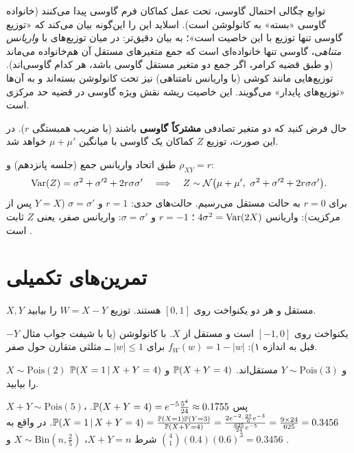 \begin{note}
\notetitle توابع چگالی احتمال گاوسی، تحت عمل  کماکان فرم گاوسی پیدا می‌کنند (خانواده گاوسی «بسته» به کانولوشن است). اسلاید این را این‌گونه بیان می‌کند که «توزیع گاوسی تنها توزیع با این خاصیت است»؛ به بیان دقیق‌تر: در میان توزیع‌های با \emph{واریانس متناهی}، گاوسی تنها خانواده‌ای است که جمع متغیرهای مستقل آن هم‌خانواده می‌ماند (و طبق قضیه کرامر، اگر جمع دو متغیر مستقل گاوسی باشد، هر کدام گاوسی‌اند). توزیع‌هایی مانند کوشی (با واریانس نامتناهی) نیز تحت کانولوشن بسته‌اند و به آن‌ها «توزیع‌های پایدار» می‌گویند. این خاصیت ریشه نقش ویژه گاوسی در قضیه حد مرکزی است.
\end{note}

حال فرض کنید که دو متغیر تصادفی \textbf{مشترکاً گاوسی} باشند (با ضریب همبستگی $r$). در این صورت، توزیع $Z$ کماکان یک گاوسی با میانگین $\mu+\mu'$ خواهد شد.

\begin{question}
\begin{answer}
طبق اتحاد واریانس جمع (جلسه پانزدهم) و $\rho_{XY}=r$:
\[
\Var(Z)=\sigma^2+\sigma'^2+2r\sigma\sigma'\quad\Longrightarrow\quad Z\sim\mathcal N\big(\mu+\mu',\ \sigma^2+\sigma'^2+2r\sigma\sigma'\big).
\]
برای $r=0$ به حالت مستقل می‌رسیم. حالت‌های حدی: $r=1$ و $\sigma=\sigma'$ ($Y=X$ پس از مرکزیت): واریانس $4\sigma^2=\operatorname{Var}(2X)$ \checkmark؛ $r=-1$ و $\sigma=\sigma'$: واریانس صفر، یعنی $Z$ ثابت است \checkmark.
\end{answer}
\end{question}

\section{تمرین‌های تکمیلی}

\begin{exercise}
$X,Y$ مستقل و هر دو یکنواخت روی $[0,1]$ هستند. توزیع $W=X-Y$ را بیابید.
\end{exercise}
\begin{solution}
$-Y$ یکنواخت روی $[-1,0]$ است و مستقل از $X$. با کانولوشن (یا با شیفت جواب مثال قبل به اندازه ۱): $f_W(w)=1-|w|$ برای $|w|\le1$ ــ مثلثی متقارن حول صفر.
\end{solution}

\begin{exercise}
$X\sim\mathrm{Pois}(2)$ و $Y\sim\mathrm{Pois}(3)$ مستقل‌اند. $\mathbb{P}(X+Y=4)$ و $\mathbb{P}(X=1\,|\, X+Y=4)$ را بیابید.
\end{exercise}
\begin{solution}
$X+Y\sim\mathrm{Pois}(5)$، پس $\mathbb{P}(X+Y=4)=e^{-5}\frac{5^4}{24}\approx0.1755$.
$\mathbb{P}(X=1\,|\, X+Y=4)=\frac{\mathbb{P}(X=1)\mathbb{P}(Y=3)}{\mathbb{P}(X+Y=4)}=\frac{2e^{-2}\cdot\frac{27}{6}e^{-3}}{\frac{625}{24}e^{-5}}=\frac{9\times24}{625}=0.3456$. در واقع به شرط $X+Y=n$، $X\sim\mathrm{Bin}(n,\frac{2}{5})$ و $\binom41(0.4)(0.6)^3=0.3456$ \checkmark.
\end{solution}

